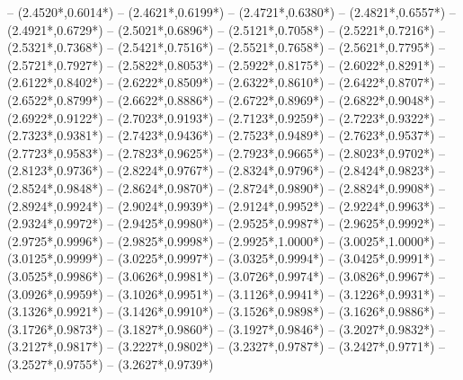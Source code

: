 {	-- ({2.4520*\dx},{0.6014*\dy})
	-- ({2.4621*\dx},{0.6199*\dy})
	-- ({2.4721*\dx},{0.6380*\dy})
	-- ({2.4821*\dx},{0.6557*\dy})
	-- ({2.4921*\dx},{0.6729*\dy})
	-- ({2.5021*\dx},{0.6896*\dy})
	-- ({2.5121*\dx},{0.7058*\dy})
	-- ({2.5221*\dx},{0.7216*\dy})
	-- ({2.5321*\dx},{0.7368*\dy})
	-- ({2.5421*\dx},{0.7516*\dy})
	-- ({2.5521*\dx},{0.7658*\dy})
	-- ({2.5621*\dx},{0.7795*\dy})
	-- ({2.5721*\dx},{0.7927*\dy})
	-- ({2.5822*\dx},{0.8053*\dy})
	-- ({2.5922*\dx},{0.8175*\dy})
	-- ({2.6022*\dx},{0.8291*\dy})
	-- ({2.6122*\dx},{0.8402*\dy})
	-- ({2.6222*\dx},{0.8509*\dy})
	-- ({2.6322*\dx},{0.8610*\dy})
	-- ({2.6422*\dx},{0.8707*\dy})
	-- ({2.6522*\dx},{0.8799*\dy})
	-- ({2.6622*\dx},{0.8886*\dy})
	-- ({2.6722*\dx},{0.8969*\dy})
	-- ({2.6822*\dx},{0.9048*\dy})
	-- ({2.6922*\dx},{0.9122*\dy})
	-- ({2.7023*\dx},{0.9193*\dy})
	-- ({2.7123*\dx},{0.9259*\dy})
	-- ({2.7223*\dx},{0.9322*\dy})
	-- ({2.7323*\dx},{0.9381*\dy})
	-- ({2.7423*\dx},{0.9436*\dy})
	-- ({2.7523*\dx},{0.9489*\dy})
	-- ({2.7623*\dx},{0.9537*\dy})
	-- ({2.7723*\dx},{0.9583*\dy})
	-- ({2.7823*\dx},{0.9625*\dy})
	-- ({2.7923*\dx},{0.9665*\dy})
	-- ({2.8023*\dx},{0.9702*\dy})
	-- ({2.8123*\dx},{0.9736*\dy})
	-- ({2.8224*\dx},{0.9767*\dy})
	-- ({2.8324*\dx},{0.9796*\dy})
	-- ({2.8424*\dx},{0.9823*\dy})
	-- ({2.8524*\dx},{0.9848*\dy})
	-- ({2.8624*\dx},{0.9870*\dy})
	-- ({2.8724*\dx},{0.9890*\dy})
	-- ({2.8824*\dx},{0.9908*\dy})
	-- ({2.8924*\dx},{0.9924*\dy})
	-- ({2.9024*\dx},{0.9939*\dy})
	-- ({2.9124*\dx},{0.9952*\dy})
	-- ({2.9224*\dx},{0.9963*\dy})
	-- ({2.9324*\dx},{0.9972*\dy})
	-- ({2.9425*\dx},{0.9980*\dy})
	-- ({2.9525*\dx},{0.9987*\dy})
	-- ({2.9625*\dx},{0.9992*\dy})
	-- ({2.9725*\dx},{0.9996*\dy})
	-- ({2.9825*\dx},{0.9998*\dy})
	-- ({2.9925*\dx},{1.0000*\dy})
	-- ({3.0025*\dx},{1.0000*\dy})
	-- ({3.0125*\dx},{0.9999*\dy})
	-- ({3.0225*\dx},{0.9997*\dy})
	-- ({3.0325*\dx},{0.9994*\dy})
	-- ({3.0425*\dx},{0.9991*\dy})
	-- ({3.0525*\dx},{0.9986*\dy})
	-- ({3.0626*\dx},{0.9981*\dy})
	-- ({3.0726*\dx},{0.9974*\dy})
	-- ({3.0826*\dx},{0.9967*\dy})
	-- ({3.0926*\dx},{0.9959*\dy})
	-- ({3.1026*\dx},{0.9951*\dy})
	-- ({3.1126*\dx},{0.9941*\dy})
	-- ({3.1226*\dx},{0.9931*\dy})
	-- ({3.1326*\dx},{0.9921*\dy})
	-- ({3.1426*\dx},{0.9910*\dy})
	-- ({3.1526*\dx},{0.9898*\dy})
	-- ({3.1626*\dx},{0.9886*\dy})
	-- ({3.1726*\dx},{0.9873*\dy})
	-- ({3.1827*\dx},{0.9860*\dy})
	-- ({3.1927*\dx},{0.9846*\dy})
	-- ({3.2027*\dx},{0.9832*\dy})
	-- ({3.2127*\dx},{0.9817*\dy})
	-- ({3.2227*\dx},{0.9802*\dy})
	-- ({3.2327*\dx},{0.9787*\dy})
	-- ({3.2427*\dx},{0.9771*\dy})
	-- ({3.2527*\dx},{0.9755*\dy})
	-- ({3.2627*\dx},{0.9739*\dy})
}
